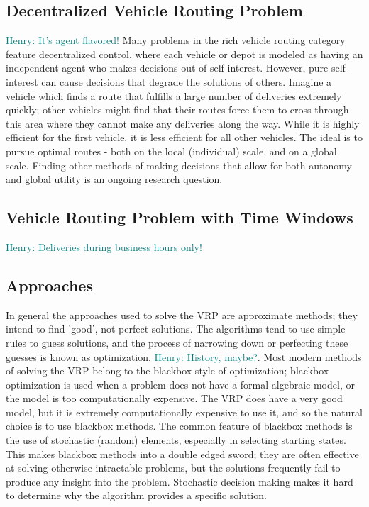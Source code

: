 \documentclass{sig-alternate}
\newcommand{\allcomments}[1]{{#1}}
\newcommand{\hfcomment}[1]{\textcolor{Teal}{\allcomments{Henry: {#1}}}}
\begin{document}
\subsection{Decentralized Vehicle Routing Problem}
\hfcomment{It's agent flavored!}
Many problems in the rich vehicle routing category feature decentralized control, where each vehicle or depot is modeled as having an independent agent who makes decisions out of self-interest. However, pure self-interest can cause decisions that degrade the solutions of others. Imagine a vehicle which finds a route that fulfills a large number of deliveries extremely quickly; other vehicles might find that their routes force them to cross through this area where they cannot make any deliveries along the way. While it is highly efficient for the first vehicle, it is less efficient for all other vehicles. The ideal is to pursue optimal routes - both on the local (individual) scale, and on a global scale. Finding other methods of making decisions that allow for both autonomy and global utility is an ongoing research question. 
\subsection{Vehicle Routing Problem with Time Windows}
\hfcomment{Deliveries during business hours only!}
\subsection{Approaches}
In general the approaches used to solve the VRP are approximate methods; they intend to find 'good', not perfect solutions. The algorithms tend to use simple rules to guess solutions, and the process of narrowing down or perfecting these guesses is known as optimization. \hfcomment{History, maybe?}. Most modern methods of solving the VRP belong to the blackbox style of optimization; blackbox optimization is used when a problem does not have a formal algebraic model, or the model is too computationally expensive. The VRP does have a very good model, but it is extremely computationally expensive to use it, and so the natural choice is to use blackbox methods. The common feature of blackbox methods is the use of stochastic (random) elements, especially in selecting starting states. This makes blackbox methods into a double edged sword; they are often effective at solving otherwise intractable problems, but the solutions frequently fail to produce any insight into the problem. Stochastic decision making makes it hard to determine why the algorithm provides a specific solution. 
\end{document}
